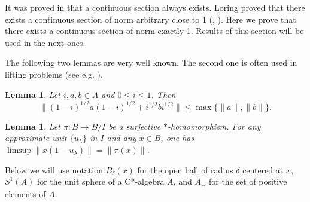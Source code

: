 \documentclass{article}%
\newtheorem{lemma}[theorem]{Lemma}
\begin{document}
\medskip

It was proved in \cite{Bartle} that a continuous section always exists. Loring proved  that there exists a continuous section of norm arbitrary close to 1 (\cite{LoringSection}, \cite[Th. 3.2]{Manuilov}). Here we prove that there exists a continuous section of norm exactly 1. Results of this section will be used in the next ones.

\medskip


The following two lemmas are very well known. The second one is often used in lifting problems (see e.g. \cite{LoringBook}).



\begin{lemma}\label{NCinterval} Let $i, a, b\in A$  and  $0\le i \le 1$. Then $$\|(1-i)^{1/2}a(1-i)^{1/2} + i^{1/2}bi^{1/2}\| \le \max\{\|a\|, \|b\|\}. $$
\end{lemma}


\begin{lemma}\label{folklore}
Let $\pi: B\to B/I$ be a surjective $\ast$-homomorphism.
For any approximate unit  $\{u_{\lambda}\}$ in $I$ and any $x\in B$, one has $\limsup \|x(1- u_{\lambda})\| = \|\pi(x)\|$.
\end{lemma}


\medskip

Below we will use notation $B_{\delta}(x)$ for the open ball of radius $\delta$ centered at $x$, $S^1(A)$ for the unit sphere of a C*-algebra $A$,  and $A_{+}$ for the set of positive elements of $A$.


\medskip
\end{document}
